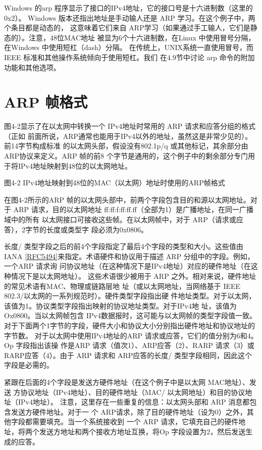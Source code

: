 Windows 的arp 程序显示了接口的IPv4地址，它的接口号是十六进制数（这里的0x2）。
Windows 版本还指出地址是手动输人还是 ARP 学习。在这个例子中，两个条目都是动态的，
这意味着它们来自 ARP学习（如果通过手工输人，它们是静态的）。注意，48位MAC地址
被显为6个十六进制数，在Linux 中使用冒号分隔，在Windows 中使用短杠（dash）分隔。
在传统上，UNIX系统一直使用冒号，而IEEE 标准和其他操作系统倾向于使用短杠。我们
在4.9节中讨论 arp 命令的附加功能和其他选项。

\section{ARP 帧格式}

图4-2显示了在以太网中转换一个 IPv4地址时常用的 ARP 请求和应答分组的格式（正如
前面所说，ARP通常也能用于IPv4以外的地址，虽然这是非常少见的）。前14字节构成标准
的以太网头部，假设没有802.1p/q 或其他标记，其余部分由 ARP协议来定义。ARP 帧的前8
个字节是通用的，这个例子中的剩余部分专门用于将IPv4地址映射到48位的以太网地址。

图4-2 IPv4地址映射到48位的MAC（以太网）地址时使用的ARP帧格式

在图4-2所示的ARP 帧的以太网头部中，前两个字段包含目的和源以太网地址。对于
ARP 请求，目的以太网地址 ff:ff:f:ff:ff.ff（全部为1）是广播地址，在同一广播域中的所有
以太网接口可接收这些帧。在以太网帧中，对于 ARP（请求或应答），2字节的长度或类型字
段必须为0x0806。

长度/ 类型字段之后的前4个字段指定了最后4个字段的类型和大小。这些值由IANA
\href{https://www.rfc-editor.org/rfc/rfc5494}{[RFC5494]}来指定。术语硬件和协议用于描述 ARP 分组中的字段。例如，一个ARP 请求询
问协议地址（在这种情况下是IPv4地址）对应的硬件地址（在这种情况下是以太网地址）。
这些术语很少被用于 ARP 之外。相对来说，硬件地址的常见术语有MAC、物理或链路层地
址（或以太网地址，当网络基于 IEEE 802.3/以太网的一系列规范时）。硬件类型字段指出硬
件地址类型。对于以太网，该值为1。协议类型字段指出映射的协议地址类型。对于IPv4地
址，该值为Ox0800。当以太网帧包含 IPv4数据报时，这可能与以太网帧的类型字段值一致。
对于下面两个1字节的字段，硬件大小和协议大小分别指出硬件地址和协议地址的字节数。
对于以太网中使用IPv4地址的ARP 请求或应答，它们的值分别为6和4。Op 字段指出该操
作是ARP 请求（值次1）、ARP应答（2）、RARP 请求（3）或RARP应答（4）。由于 ARP
请求和 ARP应答的长度/ 类型字段相同，因此这个字段是必需的。

紧跟在后面的4个字段是发送方硬件地址（在这个例子中是以太网 MAC地址）、发送
方协议地址（IPv4地址）、目的硬件地址（MAC/ 以太网地址）和目的协议地址（IPv4地址）。
注意，这里存在一些重复的信息：以太网头部和 ARP 消息都包含发送方硬件地址。对于一
个 ARP请求，除了目的硬件地址（设为0）之外，其他字段都需要填充。当一个系统接收到
一个 ARP 请求，它填充自己的硬件地址，将两个发送方地址和两个接收方地址互换，将Op
字段设置为2，然后发送生成的应答。


